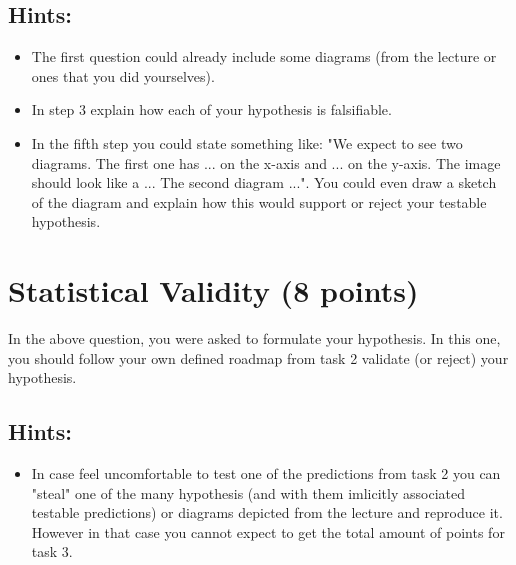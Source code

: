 \documentclass{WeSTassignment}
\begin{document}
\subsection{Hints:}
\begin{itemize}
\item The first question could already include some diagrams (from the lecture or ones that you did yourselves).
\item In step 3 explain how each of your hypothesis is falsifiable. 
\item In the fifth step you could state something like: "We expect to see two diagrams. The first one has ... on the x-axis and ... on the y-axis. The image should look like a ... The second diagram ...". You could even draw a sketch of the diagram and explain how this would support or reject your testable hypothesis. 
\end{itemize}



\section{Statistical Validity (8 points)}
In the above question, you were asked to formulate your hypothesis. In this one, you should follow your own defined roadmap from task 2 validate (or reject) your hypothesis. 

\subsection{Hints:}
\begin{itemize}
\item In case feel uncomfortable to test one of the predictions from task 2 you can "steal" one of the many hypothesis (and with them imlicitly associated testable predictions) or diagrams depicted from the lecture and reproduce it. However in that case you cannot expect to get the total amount of points for task 3. 
\end{itemize}
\end{document}
